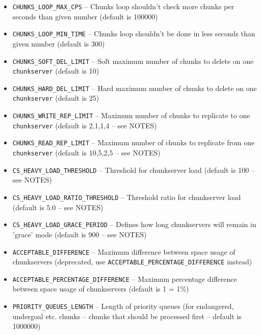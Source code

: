 \documentclass[a4paper,11pt,english]{report}
\def\code#1{\texttt{#1}}
\begin{document}
\begin{itemize}
					\item \code{CHUNKS\_LOOP\_MAX\_CPS}
						-- Chunks loop shouldn't check more chunks per seconds  than  given
						number (default is 100000)

					\item \code{CHUNKS\_LOOP\_MIN\_TIME}
						-- Chunks  loop shouldn't be done in less seconds than given number
						(default is 300)

					\item \code{CHUNKS\_SOFT\_DEL\_LIMIT}
						-- Soft maximum number of  chunks  to  delete  on  one  \code{chunkserver}
						(default is 10)

					\item \code{CHUNKS\_HARD\_DEL\_LIMIT}
						-- Hard  maximum  number  of  chunks  to  delete on one \code{chunkserver}
						(default is 25)

					\item \code{CHUNKS\_WRITE\_REP\_LIMIT}
						-- Maximum number of chunks to replicate to one \code{chunkserver} (default is 2,1,1,4 -- see NOTES)

					\item \code{CHUNKS\_READ\_REP\_LIMIT}
						-- Maximum number of chunks to replicate from one \code{chunkserver} (default is 10,5,2,5 -- see NOTES)

					\item \code{CS\_HEAVY\_LOAD\_THRESHOLD}
						-- Threshold for chunkserver load (default is 100 -- see NOTES)

					\item \code{CS\_HEAVY\_LOAD\_RATIO\_THRESHOLD}
						-- Threshold ratio for chunkserver load (default is 5.0 -- see NOTES)

					\item \code{CS\_HEAVY\_LOAD\_GRACE\_PERIOD}
						-- Defines how long chunkservers will remain in 'grace' mode (default is 900 -- see NOTES)

					\item \code{ACCEPTABLE\_DIFFERENCE}
						-- Maximum difference between space usage of chunkservers (deprecated, use \code{ACCEPTABLE\_PERCENTAGE\_DIFFERENCE} instead)
						
					\item \code{ACCEPTABLE\_PERCENTAGE\_DIFFERENCE}
						-- Maximum percentage difference between space usage of chunkservers (default is 1 = 1\%)
					\item \code{PRIORITY\_QUEUES\_LENGTH}
						-- Length of priority queues (for endangered, undergoal etc. chunks -- chunks that should be processed first -- default is 1000000)


\end{itemize}
\end{document}
